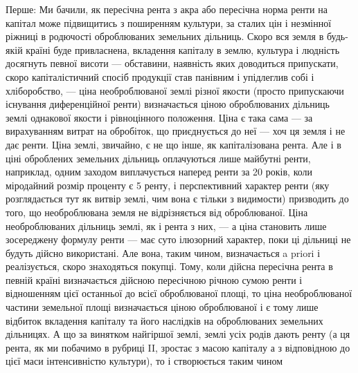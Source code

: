 Перше: Ми бачили, як пересічна рента з акра або пересічна норма
ренти на капітал може підвищитись з поширенням культури, за сталих цін і
незмінної ріжниці в родючості оброблюваних земельних дільниць. Скоро вся
земля в будь-якій країні буде привласнена, вкладення капіталу в землю, культура
і людність досягнуть певної висоти — обставини, наявність яких доводиться
припускати, скоро капіталістичний спосіб продукції став панівним і упідлеглив
собі і хліборобство, — ціна необроблюваної землі різної якости (просто припускаючи
існування диференційної ренти) визначається ціною оброблюваних дільниць
землі однакової якости і рівноцінного положення. Ціна є така сама — за вирахуванням
витрат на обробіток, що приєднується до неї — хоч ця земля і не
дає ренти. Ціна землі, звичайно, є не що інше, як капіталізована рента. Але
і в ціні оброблених земельних дільниць оплачуються лише майбутні ренти, наприклад,
одним заходом виплачується наперед ренти за 20 років, коли міродайний
розмір проценту є 5%
ренту, і перспективний характер ренти (яку розглядається тут як витвір землі, чим
вона є тільки з видимости) призводить до того, що необроблювана земля не
відрізняється від оброблюваної. Ціна необроблюваних дільниць землі, як і рента
з них, — а ціна становить лише зосереджену формулу ренти — має суто ілюзорний
характер, поки ці дільниці не будуть дійсно використані. Але вона, таким
чином, визначається a priori і реалізується, скоро знаходяться покупці. Тому,
коли дійсна пересічна рента в певній країні визначається дійсною пересічною
річною сумою ренти і відношенням цієї останньої до всієї оброблюваної площі,
то ціна необроблюваної частини земельної площі визначається ціною оброблюваної
і є тому лише відбиток вкладення капіталу та його наслідків на оброблюваних
земельних дільницях. А що за винятком найгіршої землі, землі усіх родів
дають ренту (а ця рента, як ми побачимо в рубриці II, зростає з масою капіталу
а з відповідною до цієї маси інтенсивністю культури), то і створюється таким чином

